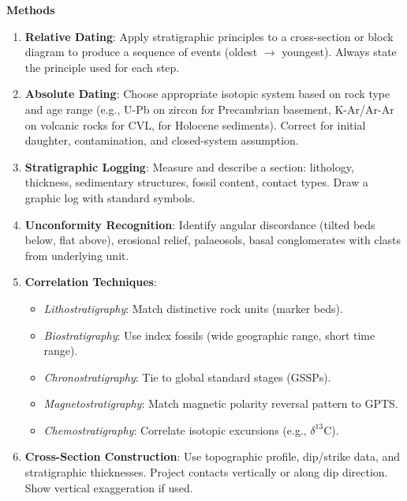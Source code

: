 \documentclass[11pt]{article}
\begin{document}
\begin{bilan}
\textbf{Methods}
\begin{enumerate}
\item \textbf{Relative Dating}: Apply stratigraphic principles to a cross-section or block diagram to produce a sequence of events (oldest $\to$ youngest). Always state the principle used for each step.
\item \textbf{Absolute Dating}: Choose appropriate isotopic system based on rock type and age range (e.g., U-Pb on zircon for Precambrian basement, K-Ar/Ar-Ar on volcanic rocks for CVL,  for Holocene sediments). Correct for initial daughter, contamination, and closed-system assumption.
\item \textbf{Stratigraphic Logging}: Measure and describe a section: lithology, thickness, sedimentary structures, fossil content, contact types. Draw a graphic log with standard symbols.
\item \textbf{Unconformity Recognition}: Identify angular discordance (tilted beds below, flat above), erosional relief, palaeosols, basal conglomerates with clasts from underlying unit.
\item \textbf{Correlation Techniques}: 
  \begin{itemize}
  \item \emph{Lithostratigraphy}: Match distinctive rock units (marker beds).
  \item \emph{Biostratigraphy}: Use index fossils (wide geographic range, short time range).
  \item \emph{Chronostratigraphy}: Tie to global standard stages (GSSPs).
  \item \emph{Magnetostratigraphy}: Match magnetic polarity reversal pattern to GPTS.
  \item \emph{Chemostratigraphy}: Correlate isotopic excursions (e.g., $\delta^{13}$C).
  \end{itemize}
\item \textbf{Cross-Section Construction}: Use topographic profile, dip/strike data, and stratigraphic thicknesses. Project contacts vertically or along dip direction. Show vertical exaggeration if used.
\end{enumerate}


\end{bilan}
\end{document}
